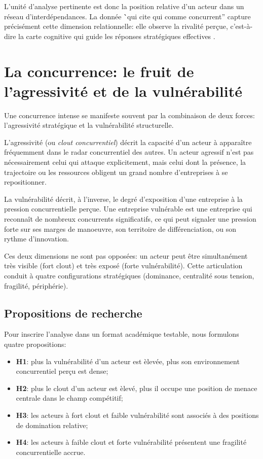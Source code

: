 \documentclass[11pt,a4paper]{article}
\begin{document}
L'unit\'e d'analyse pertinente est donc la position relative d'un acteur dans un r\'eseau d'interd\'ependances. La donn\'ee \``qui cite qui comme concurrent'' capture pr\'ecis\'ement cette dimension relationnelle: elle observe la rivalit\'e per\c cue, c'est-\`a-dire la carte cognitive qui guide les r\'eponses strat\'egiques effectives \citep{chen1996amr,kilduff2010}.

\section{La concurrence: le fruit de l'agressivit\'e et de la vuln\'erabilit\'e}
Une concurrence intense se manifeste souvent par la combinaison de deux forces: l'agressivit\'e strat\'egique et la vuln\'erabilit\'e structurelle.

L'agressivit\'e (ou \emph{clout concurrentiel}) d\'ecrit la capacit\'e d'un acteur \`a appara\^itre fr\'equemment dans le radar concurrentiel des autres. Un acteur agressif n'est pas n\'ecessairement celui qui attaque explicitement, mais celui dont la pr\'esence, la trajectoire ou les ressources obligent un grand nombre d'entreprises \`a se repositionner.

La vuln\'erabilit\'e d\'ecrit, \`a l'inverse, le degr\'e d'exposition d'une entreprise \`a la pression concurrentielle per\c cue. Une entreprise vuln\'erable est une entreprise qui reconna\^it de nombreux concurrents significatifs, ce qui peut signaler une pression forte sur ses marges de manoeuvre, son territoire de diff\'erenciation, ou son rythme d'innovation.

Ces deux dimensions ne sont pas oppos\'ees: un acteur peut \^etre simultan\'ement tr\`es visible (fort clout) et tr\`es expos\'e (forte vuln\'erabilit\'e). Cette articulation conduit \`a quatre configurations strat\'egiques (dominance, centralit\'e sous tension, fragilit\'e, p\'eriph\'erie).

\subsection*{Propositions de recherche}
Pour inscrire l'analyse dans un format acad\'emique testable, nous formulons quatre propositions:
\begin{itemize}
    \item \textbf{H1}: plus la vuln\'erabilit\'e d'un acteur est \`elev\'ee, plus son environnement concurrentiel per\c cu est dense;
    \item \textbf{H2}: plus le clout d'un acteur est \`elev\'e, plus il occupe une position de menace centrale dans le champ comp\'etitif;
    \item \textbf{H3}: les acteurs \`a fort clout et faible vuln\'erabilit\'e sont associ\'es \`a des positions de domination relative;
    \item \textbf{H4}: les acteurs \`a faible clout et forte vuln\'erabilit\'e pr\'esentent une fragilit\'e concurrentielle accrue.
\end{itemize}
\end{document}
